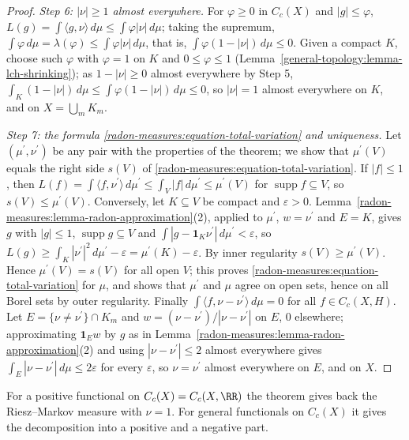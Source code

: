 \begin{proof}
\emph{Step 6: $|\nu| \geq 1$ almost everywhere.} For $\varphi \geq 0$ in $C_c(X)$ and $|g| \leq \varphi$, $L(g) = \int\langle g, \nu\rangle\,d\mu \leq \int\varphi|\nu|\,d\mu$; taking the supremum,
$\int\varphi\,d\mu = \lambda(\varphi) \leq \int\varphi|\nu|\,d\mu$, that is, $\int\varphi(1 - |\nu|)\,d\mu \leq 0$. Given a compact $K$, choose such $\varphi$ with $\varphi = 1$ on $K$ and $0 \leq \varphi \leq 1$
(Lemma~\ref{general-topology:lemma-lch-shrinking}); as $1 - |\nu| \geq 0$ almost everywhere by Step 5, $\int_K(1 - |\nu|)\,d\mu \leq \int\varphi(1 - |\nu|)\,d\mu \leq 0$, so $|\nu| = 1$ almost
everywhere on $K$, and on $X = \bigcup_mK_m$.

\emph{Step 7: the formula \eqref{radon-measures:equation-total-variation} and uniqueness.} Let $(\mu^{\prime}, \nu^{\prime})$ be any pair with the properties of the theorem; we show that $\mu^{\prime}(V)$ equals
the right side $s(V)$ of \eqref{radon-measures:equation-total-variation}. If $|f| \leq 1$, then $L(f) = \int\langle f, \nu^{\prime}\rangle\,d\mu^{\prime} \leq \int_V|f|\,d\mu^{\prime} \leq \mu^{\prime}(V)$ for
$\operatorname{supp}f \subseteq V$, so $s(V) \leq \mu^{\prime}(V)$. Conversely, let $K \subseteq V$ be compact and $\varepsilon > 0$. Lemma~\ref{radon-measures:lemma-radon-approximation}(2), applied to $\mu^{\prime}$,
$w = \nu^{\prime}$ and $E = K$, gives $g$ with $|g| \leq 1$, $\operatorname{supp}g \subseteq V$ and $\int|g - \mathbf{1}_K\nu^{\prime}|\,d\mu^{\prime} < \varepsilon$, so
$L(g) \geq \int_K|\nu^{\prime}|^2\,d\mu^{\prime} - \varepsilon = \mu^{\prime}(K) - \varepsilon$. By inner regularity $s(V) \geq \mu^{\prime}(V)$. Hence $\mu^{\prime}(V) = s(V)$ for all open $V$; this proves
\eqref{radon-measures:equation-total-variation} for $\mu$, and shows that $\mu^{\prime}$ and $\mu$ agree on open sets, hence on all Borel sets by outer regularity. Finally
$\int\langle f, \nu - \nu^{\prime}\rangle\,d\mu = 0$ for all $f \in C_c(X, H)$. Let $E = \{\nu \neq \nu^{\prime}\} \cap K_m$ and $w = (\nu - \nu^{\prime})/|\nu - \nu^{\prime}|$ on $E$, $0$ elsewhere; approximating
$\mathbf{1}_Ew$ by $g$ as in Lemma~\ref{radon-measures:lemma-radon-approximation}(2) and using $|\nu - \nu^{\prime}| \leq 2$ almost everywhere gives $\int_E|\nu - \nu^{\prime}|\,d\mu \leq 2\varepsilon$ for every
$\varepsilon$, so $\nu = \nu^{\prime}$ almost everywhere on $E$, and on $X$.
\end{proof}

For a positive functional on $C_c(X) = C_c(X, \RR)$ the theorem gives back the Riesz--Markov measure with $\nu = 1$. For general functionals on $C_c(X)$ it gives the decomposition into a positive and a negative
part.

